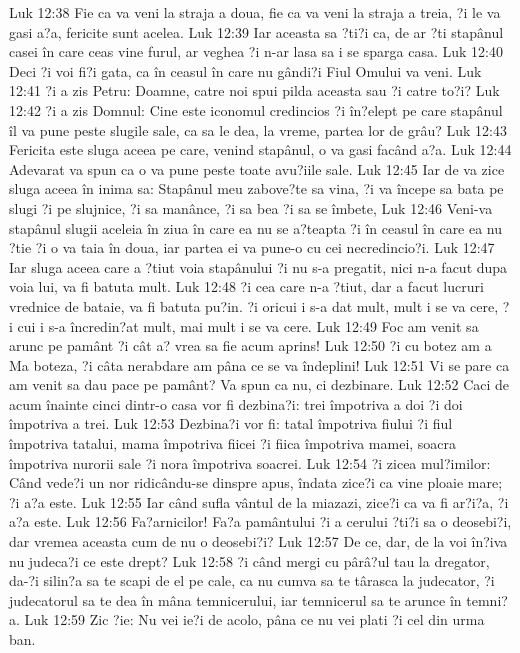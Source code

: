 Luk 12:38  Fie ca va veni la straja a doua, fie ca va veni la straja a treia, ?i le va gasi a?a, fericite sunt acelea.
Luk 12:39  Iar aceasta sa ?ti?i ca, de ar ?ti stapânul casei în care ceas vine furul, ar veghea ?i n-ar lasa sa i se sparga casa.
Luk 12:40  Deci ?i voi fi?i gata, ca în ceasul în care nu gândi?i Fiul Omului va veni.
Luk 12:41  ?i a zis Petru: Doamne, catre noi spui pilda aceasta sau ?i catre to?i?
Luk 12:42  ?i a zis Domnul: Cine este iconomul credincios ?i în?elept pe care stapânul îl va pune peste slugile sale, ca sa le dea, la vreme, partea lor de grâu?
Luk 12:43  Fericita este sluga aceea pe care, venind stapânul, o va gasi facând a?a.
Luk 12:44  Adevarat va spun ca o va pune peste toate avu?iile sale.
Luk 12:45  Iar de va zice sluga aceea în inima sa: Stapânul meu zabove?te sa vina, ?i va începe sa bata pe slugi ?i pe slujnice, ?i sa manânce, ?i sa bea ?i sa se îmbete,
Luk 12:46  Veni-va stapânul slugii aceleia în ziua în care ea nu se a?teapta ?i în ceasul în care ea nu ?tie ?i o va taia în doua, iar partea ei va pune-o cu cei necredincio?i.
Luk 12:47  Iar sluga aceea care a ?tiut voia stapânului ?i nu s-a pregatit, nici n-a facut dupa voia lui, va fi batuta mult.
Luk 12:48  ?i cea care n-a ?tiut, dar a facut lucruri vrednice de bataie, va fi batuta pu?in. ?i oricui i s-a dat mult, mult i se va cere, ?i cui i s-a încredin?at mult, mai mult i se va cere.
Luk 12:49  Foc am venit sa arunc pe pamânt ?i cât a? vrea sa fie acum aprins!
Luk 12:50  ?i cu botez am a Ma boteza, ?i câta nerabdare am pâna ce se va îndeplini!
Luk 12:51  Vi se pare ca am venit sa dau pace pe pamânt? Va spun ca nu, ci dezbinare.
Luk 12:52  Caci de acum înainte cinci dintr-o casa vor fi dezbina?i: trei împotriva a doi ?i doi împotriva a trei.
Luk 12:53  Dezbina?i vor fi: tatal împotriva fiului ?i fiul împotriva tatalui, mama împotriva fiicei ?i fiica împotriva mamei, soacra împotriva nurorii sale ?i nora împotriva soacrei.
Luk 12:54  ?i zicea mul?imilor: Când vede?i un nor ridicându-se dinspre apus, îndata zice?i ca vine ploaie mare; ?i a?a este.
Luk 12:55  Iar când sufla vântul de la miazazi, zice?i ca va fi ar?i?a, ?i a?a este.
Luk 12:56  Fa?arnicilor! Fa?a pamântului ?i a cerului ?ti?i sa o deosebi?i, dar vremea aceasta cum de nu o deosebi?i?
Luk 12:57  De ce, dar, de la voi în?iva nu judeca?i ce este drept?
Luk 12:58  ?i când mergi cu pârâ?ul tau la dregator, da-?i silin?a sa te scapi de el pe cale, ca nu cumva sa te târasca la judecator, ?i judecatorul sa te dea în mâna temnicerului, iar temnicerul sa te arunce în temni?a.
Luk 12:59  Zic ?ie: Nu vei ie?i de acolo, pâna ce nu vei plati ?i cel din urma ban.
